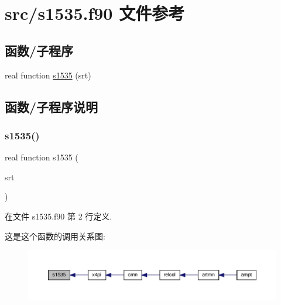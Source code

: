 \hypertarget{s1535_8f90}{}\section{src/s1535.f90 文件参考}
\label{s1535_8f90}
\subsection*{函数/子程序}
\begin{DoxyCompactItemize}
\item 
real function \mbox{\hyperlink{s1535_8f90_a4c181ef0c1bf3b88da746c7d6ad0c56d}{s1535}} (srt)
\end{DoxyCompactItemize}


\subsection{函数/子程序说明}
\mbox{\label{s1535_8f90_a4c181ef0c1bf3b88da746c7d6ad0c56d}} 
\subsubsection{\texorpdfstring{s1535()}{s1535()}}
{\footnotesize\ttfamily real function s1535 (\begin{DoxyParamCaption}\item[{}]{srt }\end{DoxyParamCaption})}



在文件 s1535.\+f90 第 2 行定义.

这是这个函数的调用关系图\+:
\nopagebreak
\begin{figure}[H]
\begin{center}
\leavevmode
\includegraphics[width=350pt]{s1535_8f90_a4c181ef0c1bf3b88da746c7d6ad0c56d_icgraph}
\end{center}
\end{figure}
